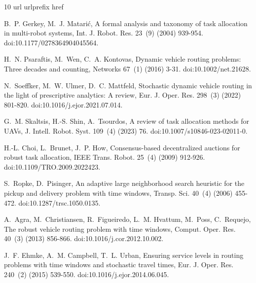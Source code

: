 \documentclass[a4paper,fleqn]{cas-dc}
\begin{document}
\begin{thebibliography}{10}
\expandafter\ifx\csname url\endcsname\relax
  \def\url#1{\texttt{#1}}\fi
\expandafter\ifx\csname urlprefix\endcsname\relax\def\urlprefix{URL }\fi
\expandafter\ifx\csname href\endcsname\relax
  \def\href#1#2{#2} \def\path#1{#1}\fi

B.~P. Gerkey, M.~J. Matari{\'c}, A formal analysis and taxonomy of task
  allocation in multi-robot systems, Int. J. Robot. Res. 23~(9) (2004)
  939-954.
\newblock \href {https://doi.org/10.1177/0278364904045564}
  {\path{doi:10.1177/0278364904045564}}.

H.~N. Psaraftis, M.~Wen, C.~A. Kontovas, Dynamic vehicle routing problems:
  Three decades and counting, Networks 67~(1) (2016) 3-31.
\newblock \href {https://doi.org/10.1002/net.21628}
  {\path{doi:10.1002/net.21628}}.

N.~Soeffker, M.~W. Ulmer, D.~C. Mattfeld, Stochastic dynamic vehicle routing in
  the light of prescriptive analytics: A review, Eur. J. Oper. Res. 298~(3)
  (2022) 801-820.
\newblock \href {https://doi.org/10.1016/j.ejor.2021.07.014}
  {\path{doi:10.1016/j.ejor.2021.07.014}}.

G.~M. Skaltsis, H.-S. Shin, A.~Tsourdos, A review of task allocation methods
  for {UAVs}, J. Intell. Robot. Syst. 109~(4) (2023) 76.
\newblock \href {https://doi.org/10.1007/s10846-023-02011-0}
  {\path{doi:10.1007/s10846-023-02011-0}}.

H.-L. Choi, L.~Brunet, J.~P. How, Consensus-based decentralized auctions for
  robust task allocation, IEEE Trans. Robot. 25~(4) (2009) 912-926.
\newblock \href {https://doi.org/10.1109/TRO.2009.2022423}
  {\path{doi:10.1109/TRO.2009.2022423}}.

S.~Ropke, D.~Pisinger, An adaptive large neighborhood search heuristic for the
  pickup and delivery problem with time windows, Transp. Sci. 40~(4) (2006)
  455-472.
\newblock \href {https://doi.org/10.1287/trsc.1050.0135}
  {\path{doi:10.1287/trsc.1050.0135}}.

A.~Agra, M.~Christiansen, R.~Figueiredo, L.~M. Hvattum, M.~Poss, C.~Requejo,
  The robust vehicle routing problem with time windows, Comput. Oper. Res.
  40~(3) (2013) 856-866.
\newblock \href {https://doi.org/10.1016/j.cor.2012.10.002}
  {\path{doi:10.1016/j.cor.2012.10.002}}.

J.~F. Ehmke, A.~M. Campbell, T.~L. Urban, Ensuring service levels in routing
  problems with time windows and stochastic travel times, Eur. J. Oper. Res.
  240~(2) (2015) 539-550.
\newblock \href {https://doi.org/10.1016/j.ejor.2014.06.045}
  {\path{doi:10.1016/j.ejor.2014.06.045}}.


\end{thebibliography}
\end{document}
